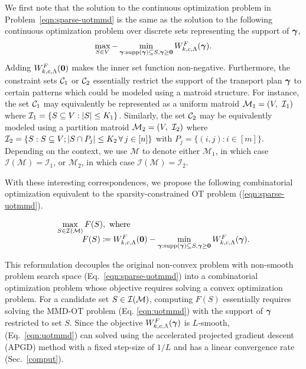 We first note that the solution to the continuous optimization problem in Problem~\ref{eqn:sparse-uotmmd} is the same as the solution to the following continuous optimization problem over discrete sets representing the support of $\bm{\gamma}$,
\begin{equation*}
\begin{array}{l}
\max\limits_{S\in V} -\min\limits_{\bm{\gamma}:\textup{supp}(\bm{\gamma})\subseteq S,\bm{\gamma}\geq \mathbf{0}} W^F_{k, c, \Lambda}({\bm{\gamma}}).
\end{array}
\end{equation*}
Adding $W^F_{k, c, \Lambda}(\mathbf{0})$ makes the inner set function non-negative.
Furthermore, the constraint sets $\mathcal{C}_1$ or $\mathcal{C}_2$ essentially restrict the support of the transport plan $\bm{\gamma}$ to certain patterns which could be modeled using a matroid structure.
For instance, the set $\mathcal{C}_1$ may equivalently be represented as a uniform matroid $\mathcal{M}_1=(V, \ \mathcal{I}_1)$ where $\mathcal{I}_1=\{S\subseteq V: |S|\leq K_1\}$. 
Similarly, the set $\mathcal{C}_2$ may be equivalently modeled using a partition matroid $\calM_2=(V,\ \calI_2)$ where $\mathcal{I}_2=\{S: S\subseteq V; |S\cap P_j|\leq K_2\, \forall\, j\in [n]\}$ with $P_j=\{(i, j): i\in [m]\}$. Depending on the context, we use $\mathcal{M}$ to denote either $\mathcal{M}_1$, in which case $\mathcal{I}(\mathcal{M})=\mathcal{I}_1$, or $\mathcal{M}_2$, in which case $\mathcal{I}(\mathcal{M})=\mathcal{I}_2$.

With these interesting correspondences, we propose the following combinatorial optimization equivalent to the sparsity-constrained OT problem (\ref{eqn:sparse-uotmmd}).
\begin{definitionBox}
\begin{equation}\label{eqn:reform}
\begin{array}{l}
\max\limits_{S\in \mathcal{I}(\mathcal{M})} F(S), \ \rm{where} \\
~~~\qquad F(S)\coloneqq W^F_{k, c, \Lambda}(\mathbf{0})-\min\limits_{\bm{\gamma}:\textup{supp}(\bm{\gamma})\subseteq S,\bm{\gamma}\geq \mathbf{0}} W^F_{k, c, \Lambda}({\bm{\gamma}}).
\end{array}
\end{equation}
\end{definitionBox}
This reformulation decouples the original non-convex problem with non-smooth problem search space (Eq.~\ref{eqn:sparse-uotmmd}) into a combinatorial optimization problem whose objective requires solving a convex optimization problem.
For a candidate set $S\in \mathcal{I}(\mathcal{M})$, computing $F(S)$ essentially requires solving the MMD-OT problem (Eq. \ref{eqn:uotmmd}) with the support of $\bm{\gamma}$ restricted to set $S$. Since the objective $W^F_{k, c, \Lambda}(\bm{\gamma})$ is $L$-smooth, (Eq.~\ref{eqn:uotmmd}) can solved using the accelerated projected gradient descent (APGD) method with a fixed step-size of $1/L$ and has a linear convergence rate (Sec.~\ref{comput}).

